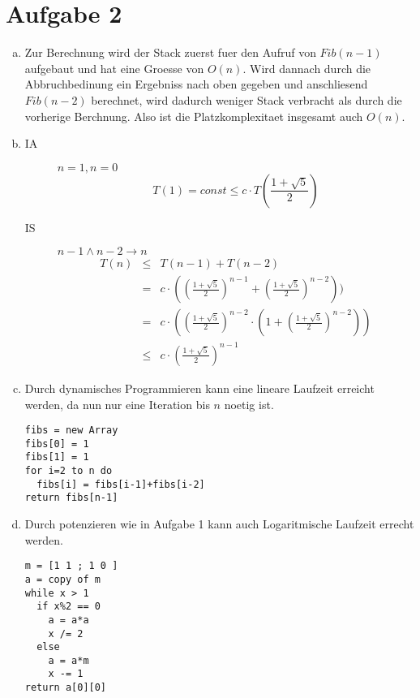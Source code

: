 \section*{Aufgabe 2}
\begin{enumerate}[(a)]
\item 

Zur Berechnung wird der Stack zuerst fuer den Aufruf von $Fib(n-1)$ aufgebaut und hat eine 
Groesse von $O(n)$. Wird dannach durch die Abbruchbedinung ein Ergebniss nach oben gegeben und anschliesend $Fib(n-2)$ 
berechnet, wird dadurch weniger Stack verbracht als durch die vorherige
Berchnung. Also ist die Platzkomplexitaet insgesamt auch $O(n)$.

\item

\begin{description}
\item[IA] $n=1, n=0$\\
 \begin{equation}
    T(1) = const \leq c \cdot T(\frac{1+\sqrt{5}}{2})
 \end{equation}
\item[IS] $n-1 \land n-2 \to n$\\
    \begin{eqnarray}
    T(n) &\leq& T(n-1) + T(n-2) \\
         &=& c \cdot ( (\frac{1+\sqrt 5}{2})^{n-1} + (\frac{1+\sqrt 5}{2})^{n-2}) ) \\
         &=& c \cdot ( (\frac{1+\sqrt 5}{2})^{n-2} \cdot (1 + (\frac{1+\sqrt 5}{2})^{n-2}) ) \\
         &\leq& c \cdot (\frac{1+\sqrt 5}{2})^{n-1}
    \end{eqnarray}
\end{description}


\item Durch dynamisches Programmieren kann eine lineare Laufzeit erreicht werden, 
    da nun nur eine Iteration bis $n$ noetig ist.

\begin{verbatim}
fibs = new Array
fibs[0] = 1
fibs[1] = 1
for i=2 to n do
  fibs[i] = fibs[i-1]+fibs[i-2]
return fibs[n-1]
\end{verbatim}


\item 
Durch potenzieren wie in Aufgabe 1 kann auch Logaritmische Laufzeit errecht werden.
\begin{verbatim}
m = [1 1 ; 1 0 ]
a = copy of m
while x > 1
  if x%2 == 0
    a = a*a
    x /= 2
  else
    a = a*m
    x -= 1
return a[0][0]
\end{verbatim}
\end{enumerate}

